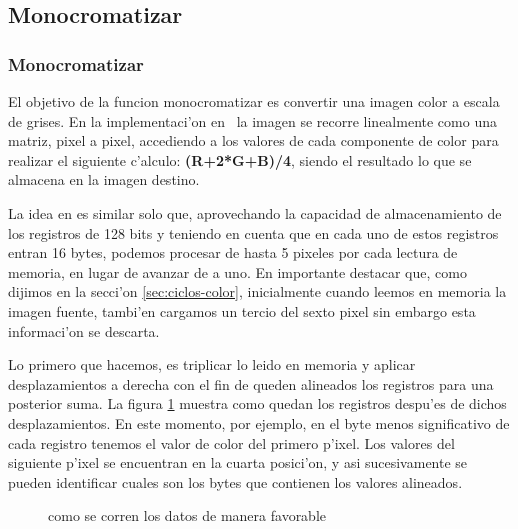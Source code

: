 \subsection{Monocromatizar}
\subsubsection{Monocromatizar  }
El objetivo de la funcion monocromatizar es convertir una imagen color a escala de grises. En la implementaci'on en 
\C\ la imagen se recorre linealmente como una matriz, pixel a pixel, accediendo a los valores de cada componente de color para realizar el siguiente c'alculo: \textbf{(R+2*G+B)/4}, siendo el resultado lo que se almacena en la imagen destino.

La idea en \ass es similar solo que, aprovechando la capacidad de almacenamiento de los registros de 128 bits
y teniendo en cuenta que en cada uno de estos registros entran 16 bytes, podemos procesar de hasta 5 pixeles
por cada lectura de memoria, en lugar de avanzar de a uno. En importante destacar que, como dijimos en la secci'on \ref{sec:ciclos-color}, inicialmente cuando leemos en memoria la imagen fuente, tambi'en cargamos un tercio del sexto pixel sin embargo esta informaci'on se descarta.

Lo primero que hacemos, es triplicar lo leido en memoria y aplicar desplazamientos a derecha con el fin de queden alineados los registros para una posterior suma. La figura \ref{est:m-dos} muestra como quedan los registros despu'es de dichos desplazamientos. En este momento, por ejemplo, en el byte menos significativo de cada registro tenemos el valor de color del primero p'ixel. Los valores del siguiente p'ixel se encuentran en la cuarta posici'on, y asi sucesivamente se pueden identificar cuales son los bytes que contienen los valores alineados.

\begin{figure}[h!]
\caption{como se corren los datos de manera favorable}
\label{est:m-dos}
\end{figure}

